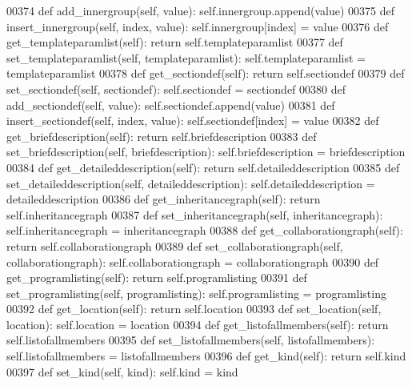 \begin{DoxyCode}
{{{{{{{{{{{{{{{{{{{{{{{{00374     \textcolor{keyword}{def }add_innergroup(self, value): self.innergroup.append(value)
00375     \textcolor{keyword}{def }insert_innergroup(self, index, value): self.innergroup[index] = value
00376     \textcolor{keyword}{def }get_templateparamlist(self): \textcolor{keywordflow}{return} self.templateparamlist
00377     \textcolor{keyword}{def }set_templateparamlist(self, templateparamlist): self.templateparamlist = templateparamlist
00378     \textcolor{keyword}{def }get_sectiondef(self): \textcolor{keywordflow}{return} self.sectiondef
00379     \textcolor{keyword}{def }set_sectiondef(self, sectiondef): self.sectiondef = sectiondef
00380     \textcolor{keyword}{def }add_sectiondef(self, value): self.sectiondef.append(value)
00381     \textcolor{keyword}{def }insert_sectiondef(self, index, value): self.sectiondef[index] = value
00382     \textcolor{keyword}{def }get_briefdescription(self): \textcolor{keywordflow}{return} self.briefdescription
00383     \textcolor{keyword}{def }set_briefdescription(self, briefdescription): self.briefdescription = briefdescription
00384     \textcolor{keyword}{def }get_detaileddescription(self): \textcolor{keywordflow}{return} self.detaileddescription
00385     \textcolor{keyword}{def }set_detaileddescription(self, detaileddescription): self.detaileddescription = detaileddescription
00386     \textcolor{keyword}{def }get_inheritancegraph(self): \textcolor{keywordflow}{return} self.inheritancegraph
00387     \textcolor{keyword}{def }set_inheritancegraph(self, inheritancegraph): self.inheritancegraph = inheritancegraph
00388     \textcolor{keyword}{def }get_collaborationgraph(self): \textcolor{keywordflow}{return} self.collaborationgraph
00389     \textcolor{keyword}{def }set_collaborationgraph(self, collaborationgraph): self.collaborationgraph = collaborationgraph
00390     \textcolor{keyword}{def }get_programlisting(self): \textcolor{keywordflow}{return} self.programlisting
00391     \textcolor{keyword}{def }set_programlisting(self, programlisting): self.programlisting = programlisting
00392     \textcolor{keyword}{def }get_location(self): \textcolor{keywordflow}{return} self.location
00393     \textcolor{keyword}{def }set_location(self, location): self.location = location
00394     \textcolor{keyword}{def }get_listofallmembers(self): \textcolor{keywordflow}{return} self.listofallmembers
00395     \textcolor{keyword}{def }set_listofallmembers(self, listofallmembers): self.listofallmembers = listofallmembers
00396     \textcolor{keyword}{def }get_kind(self): \textcolor{keywordflow}{return} self.kind
00397     \textcolor{keyword}{def }set_kind(self, kind): self.kind = kind
}}}}}}}}}}}}}}}}}}}}}}}}
\end{DoxyCode}
